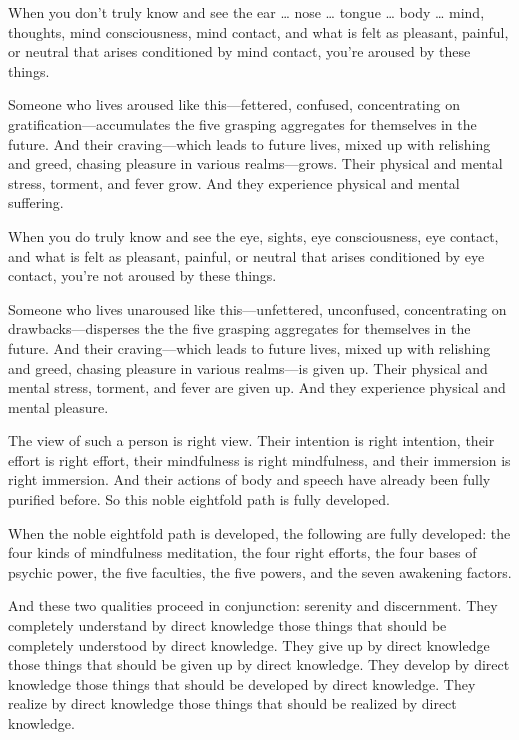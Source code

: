 \documentclass[12pt,openany]{book}%
\begin{document}
When you don’t truly know and see the ear … nose … tongue … body … mind, thoughts, mind consciousness, mind contact, and what is felt as pleasant, painful, or neutral that arises conditioned by mind contact, you’re aroused by these things. 

Someone who lives aroused like this—fettered, confused, concentrating on gratification—accumulates the five grasping aggregates for themselves in the future. And their craving—which leads to future lives, mixed up with relishing and greed, chasing pleasure in various realms—grows. Their physical and mental stress, torment, and fever grow. And they experience physical and mental suffering. 

When you do truly know and see the eye, sights, eye consciousness, eye contact, and what is felt as pleasant, painful, or neutral that arises conditioned by eye contact, you’re not aroused by these things. 

Someone who lives unaroused like this—unfettered, unconfused, concentrating on drawbacks—disperses the the five grasping aggregates for themselves in the future. And their craving—which leads to future lives, mixed up with relishing and greed, chasing pleasure in various realms—is given up. Their physical and mental stress, torment, and fever are given up. And they experience physical and mental pleasure. 

The view of such a person is right view. Their intention is right intention, their effort is right effort, their mindfulness is right mindfulness, and their immersion is right immersion. And their actions of body and speech have already been fully purified before. So this noble eightfold path is fully developed. 

When the noble eightfold path is developed, the following are fully developed: the four kinds of mindfulness meditation, the four right efforts, the four bases of psychic power, the five faculties, the five powers, and the seven awakening factors. 

And these two qualities proceed in conjunction: serenity and discernment. They completely understand by direct knowledge those things that should be completely understood by direct knowledge. They give up by direct knowledge those things that should be given up by direct knowledge. They develop by direct knowledge those things that should be developed by direct knowledge. They realize by direct knowledge those things that should be realized by direct knowledge. 
\end{document}
